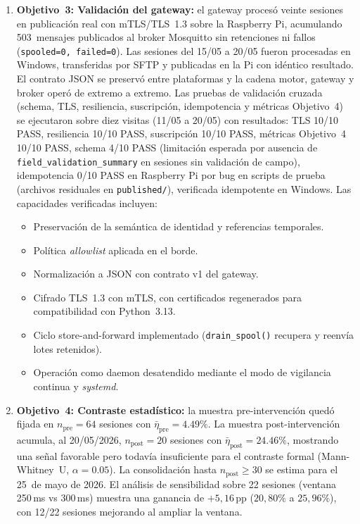 \begin{enumerate}
    \item \textbf{Objetivo~3: Validación del gateway:} el gateway procesó veinte sesiones en publicación real con mTLS/TLS~1.3 sobre la Raspberry Pi, acumulando 503~mensajes publicados al broker Mosquitto sin retenciones ni fallos (\texttt{spooled=0, failed=0}). Las sesiones del 15/05 a 20/05 fueron procesadas en Windows, transferidas por SFTP y publicadas en la Pi con idéntico resultado. El contrato JSON se preservó entre plataformas y la cadena motor, gateway y broker operó de extremo a extremo. Las pruebas de validación cruzada (schema, TLS, resiliencia, suscripción, idempotencia y métricas Objetivo~4) se ejecutaron sobre diez visitas (11/05 a 20/05) con resultados: TLS 10/10 PASS, resiliencia 10/10 PASS, suscripción 10/10 PASS, métricas Objetivo~4 10/10 PASS, schema 4/10 PASS (limitación esperada por ausencia de \texttt{field\_validation\_summary} en sesiones sin validación de campo), idempotencia 0/10 PASS en Raspberry Pi por bug en scripts de prueba (archivos residuales en \texttt{published/}), verificada idempotente en Windows. Las capacidades verificadas incluyen:
    \begin{itemize}
        \item Preservación de la semántica de identidad y referencias temporales.
        \item Política \textit{allowlist} aplicada en el borde.
        \item Normalización a JSON con contrato v1 del gateway.
        \item Cifrado TLS~1.3 con mTLS, con certificados regenerados para compatibilidad con Python~3.13.
        \item Ciclo store-and-forward implementado (\texttt{drain\_spool()} recupera y reenvía lotes retenidos).
        \item Operación como daemon desatendido mediante el modo de vigilancia continua y \textit{systemd}.
    \end{itemize}

    \item \textbf{Objetivo~4: Contraste estadístico:} la muestra pre-intervención quedó fijada en $n_{\text{pre}}=64$ sesiones con $\bar{\eta}_{\text{pre}}=4.49\%$. La muestra post-intervención acumula, al 20/05/2026, $n_{\text{post}}=20$ sesiones con $\bar{\eta}_{\text{post}}=24.46\%$, mostrando una señal favorable pero todavía insuficiente para el contraste formal (Mann-Whitney~U, $\alpha=0.05$). La consolidación hasta $n_{\text{post}} \geq 30$ se estima para el 25~de mayo de 2026. El análisis de sensibilidad sobre 22 sesiones (ventana 250\,ms vs 300\,ms) muestra una ganancia de $+5{,}16$\,pp ($20{,}80\%$ a $25{,}96\%$), con 12/22 sesiones mejorando al ampliar la ventana.
\end{enumerate}

